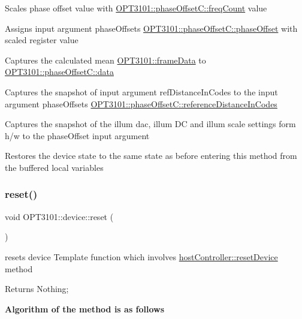 \begin{DoxyItemize}
\item Scales phase offset value with \mbox{\hyperlink{class_o_p_t3101_1_1phase_offset_c_ab95e4dde3ea8b0ad825d315160fe33ca}{O\+P\+T3101\+::phase\+Offset\+C\+::freq\+Count}} value
\item Assigns input argument phase\+Offset\textquotesingle{}s \mbox{\hyperlink{class_o_p_t3101_1_1phase_offset_c_addeef913546f1c431b4fd189478884f9}{O\+P\+T3101\+::phase\+Offset\+C\+::phase\+Offset}} with scaled register value
\item Captures the calculated mean \mbox{\hyperlink{class_o_p_t3101_1_1frame_data}{O\+P\+T3101\+::frame\+Data}} to \mbox{\hyperlink{class_o_p_t3101_1_1phase_offset_c_a2db3531b8b3c643bae7af9db0e1fd040}{O\+P\+T3101\+::phase\+Offset\+C\+::data}}
\item Captures the snapshot of input argument ref\+Distance\+In\+Codes to the input argument phase\+Offset\textquotesingle{}s \mbox{\hyperlink{class_o_p_t3101_1_1phase_offset_c_ac77c406f9d3672254fa2b91e97a22d0c}{O\+P\+T3101\+::phase\+Offset\+C\+::reference\+Distance\+In\+Codes}}
\item Captures the snapshot of the illum dac, illum DC and illum scale settings form h/w to the phase\+Offset input argument ~\newline

\item Restores the device state to the same state as before entering this method from the buffered local variables 
\end{DoxyItemize}\mbox{\label{class_o_p_t3101_1_1device_a1d37b22f535d8130c7f24799f7fa3c33}} 
\subsubsection{\texorpdfstring{reset()}{reset()}}
{\footnotesize\ttfamily void O\+P\+T3101\+::device\+::reset (\begin{DoxyParamCaption}{ }\end{DoxyParamCaption})}



resets device Template function which involves \mbox{\hyperlink{classhost_controller_aa9f25eaf4a9bda5213c70ff91c261649}{host\+Controller\+::reset\+Device}} method 

\begin{DoxyReturn}{Returns}
Nothing; 
\end{DoxyReturn}
{\bfseries Algorithm of the method is as follows}


